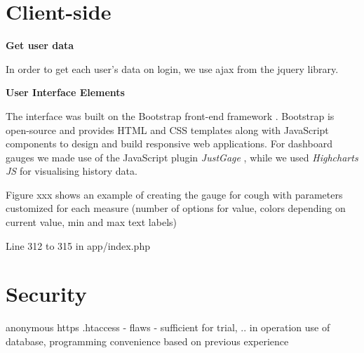  
 
 
\section{Client-side}

\textbf{Get user data}

In order to get each user's data on login, we use ajax from the jquery library. 


\textbf{User Interface Elements}

The interface was built on the Bootstrap front-end framework \citep{bootstrap}. Bootstrap is open-source and provides HTML and CSS templates along with JavaScript components to design and build responsive web applications. For dashboard gauges we made use of the JavaScript plugin \textit{JustGage} \citep{justgage}, while we used \textit{Highcharts JS} \citep{highcharts} for visualising history data. 

Figure xxx shows an example of creating the gauge for cough with parameters customized for each measure (number of options for value, colors depending on current value, min and max text labels) 

Line 312 to 315 in app/index.php 

 
\section{Security}
anonymous
https
.htaccess
 - flaws
 - sufficient for trial, .. in operation use of database, programming convenience based on previous experience